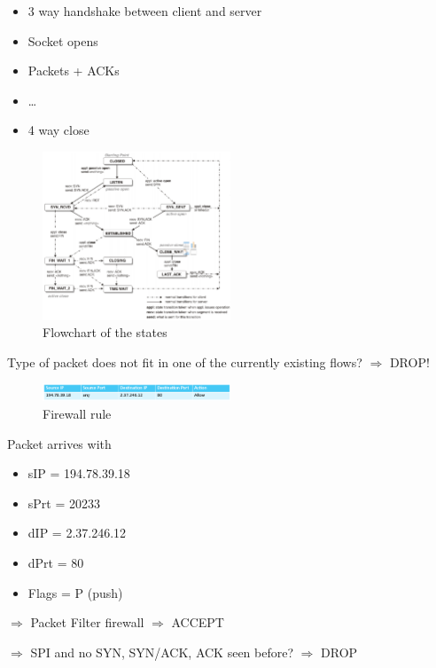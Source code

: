 \documentclass{article}
\begin{document}
\begin{itemize}
    \item 3 way handshake between client and server
    \item Socket opens
    \item Packets + ACKs
    \item \dots
    \item 4 way close
\end{itemize}

\begin{figure}[H]
    \centering
    \includegraphics[width=0.5\textwidth]{flowchart-states.png}
    \caption{Flowchart of the states}
\end{figure}


Type of packet does not fit in one of the currently existing flows? $\Rightarrow$ DROP!

\begin{figure}[H]
    \centering
    \includegraphics[width=0.5\textwidth]{spi-table.png}
    \caption{Firewall rule}
\end{figure}

Packet arrives with

\begin{itemize}
    \item sIP = 194.78.39.18
    \item sPrt = 20233
    \item dIP = 2.37.246.12
    \item dPrt = 80
    \item Flags = P (push)
\end{itemize}


$\Rightarrow$ Packet Filter firewall $\Rightarrow$ ACCEPT

$\Rightarrow$ SPI and no SYN, SYN/ACK, ACK seen before? $\Rightarrow$ DROP
\end{document}

